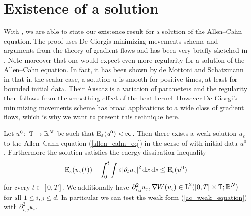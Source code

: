\section{Existence of a solution}

With , we are able to state our existence result for a
solution of the Allen--Cahn equation. The proof uses De Giorgis minimizing 
movements scheme and arguments from the theory of gradient flows and has been 
very 
briefly sketched in 
\cite{convergence_of_allen_cahn_equation_to_multiphase_mean_curvature_flow}. 
Note moreover that one would expect even more regularity for a solution 
of the Allen--Cahn equation. In fact, it has been shown by de Mottoni and 
Schatzmann in 
\cite{de_mottoni_schatzmann_geometrical_evolution_of_developed_interfaces} that 
in the scalar case, a solution u is 
smooth for positive times, at least for bounded initial data. 
Their Ansatz is a 
variation of parameters and the 
regularity then follows from the smoothing effect of the heat kernel. However 
De 
Giorgi's minimizing movements scheme has broad applications to a wide class of 
gradient flows, which is why we want to present this technique here.

\begin{theorem}
	\label{existence_of_ac_solution}
	Let $ u^{ 0 } \colon \operatorname{\mathbb{T}} \to \mathbb{ R }^{ N } $ be such that 
	$ \operatorname{E}_{ \varepsilon } ( u^{ 0 } ) < \infty $.
	Then there exists a weak solution $ u_{ \varepsilon} $ to the Allen--Cahn 
	equation (\ref{allen_cahn_eq}) in the sense of  with 
	initial data $ u^{ 0 } $.
	Furthermore the solution satisfies the energy dissipation inequality
	\begin{equation}
		\label{energy_dissipation_sharp}
		\operatorname{E}_{ \varepsilon } ( u_{ \varepsilon } ( t ) )
		+
		\int_{ 0 }^{ t }
		\int
		\varepsilon \abs{ \partial_{ t } u_{ \varepsilon } }^{ 2 }
		\dd{ x }
		\dd{ s }
		\leq
		\operatorname{E}_{ \varepsilon } ( u^{ 0 } )
	\end{equation}
	for every $ t \in [ 0 , T ] $. We additionally have
	$
	\partial_{ i , j }^{ 2 } u_{ \varepsilon }, \nabla W ( u_{ \varepsilon } ) \in \operatorname{L}^{ 2 } ( [0, T] \times \operatorname{\mathbb{T}} ; \mathbb{ R }^{ N } ) 
	$
	for all $ 1 \leq i, j \leq d $. In particular we can test the weak form (\ref{ac_weak_equation}) with $ \partial_{ i , j }^{ 2 } u_{ \varepsilon } $.
\end{theorem}

